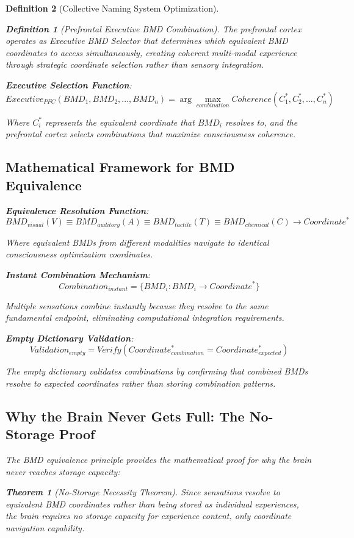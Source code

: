 \documentclass[12pt]{article}
\newtheorem{theorem}{Theorem}
\newtheorem{definition}{Definition}
\begin{document}
\begin{definition}[Collective Naming System Optimization]
\begin{definition}[Prefrontal Executive BMD Combination]
The prefrontal cortex operates as Executive BMD Selector that determines which equivalent BMD coordinates to access simultaneously, creating coherent multi-modal experience through strategic coordinate selection rather than sensory integration.
\end{definition}

\textbf{Executive Selection Function}:
$$Executive_{PFC}(BMD_1, BMD_2, ..., BMD_n) = \arg\max_{combination} Coherence(C_1^*, C_2^*, ..., C_n^*)$$

Where $C_i^*$ represents the equivalent coordinate that $BMD_i$ resolves to, and the prefrontal cortex selects combinations that maximize consciousness coherence.

\subsection{Mathematical Framework for BMD Equivalence}

\textbf{Equivalence Resolution Function}:
$$BMD_{visual}(V) \equiv BMD_{auditory}(A) \equiv BMD_{tactile}(T) \equiv BMD_{chemical}(C) \rightarrow Coordinate^*$$

Where equivalent BMDs from different modalities navigate to identical consciousness optimization coordinates.

\textbf{Instant Combination Mechanism}:
$$Combination_{instant} = \{BMD_i : BMD_i \rightarrow Coordinate^*\}$$

Multiple sensations combine instantly because they resolve to the same fundamental endpoint, eliminating computational integration requirements.

\textbf{Empty Dictionary Validation}:
$$Validation_{empty} = Verify(Coordinate^*_{combination} = Coordinate^*_{expected})$$

The empty dictionary validates combinations by confirming that combined BMDs resolve to expected coordinates rather than storing combination patterns.

\subsection{Why the Brain Never Gets Full: The No-Storage Proof}

The BMD equivalence principle provides the mathematical proof for why the brain never reaches storage capacity:

\begin{theorem}[No-Storage Necessity Theorem]
Since sensations resolve to equivalent BMD coordinates rather than being stored as individual experiences, the brain requires no storage capacity for experience content, only coordinate navigation capability.
\end{theorem}


\end{definition}
\end{document}
